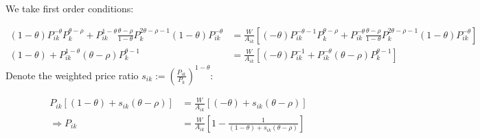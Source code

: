\documentclass[11pt]{article} %
\begin{document}
We take first order conditions:

\begin{align*}
(1-\theta)P_{ik}^{-\theta}P_k^{\theta - \rho} + P_{ik}^{1-\theta} \frac{\theta - \rho}{1-\theta}P_k^{2\theta - \rho - 1}(1-\theta)P_{ik}^{-\theta} &= \frac{W}{A_{ik}}\left[ (-\theta)P_{ik}^{-\theta-1}P_k^{\theta-\rho} + P_{ik}^{-\theta} \frac{\theta - \rho}{1-\theta} P_k^{2\theta - \rho - 1}(1-\theta)P_{ik}^{-\theta}\right]\\
(1-\theta) + P_{ik}^{1-\theta} (\theta - \rho)P_k^{\theta  - 1} &= \frac{W}{A_{ik}}\left[ (-\theta)P_{ik}^{-1} + P_{ik}^{-\theta} (\theta - \rho) P_k^{\theta - 1}\right]
\end{align*}
Denote the weighted price ratio $s_{ik}:= \left(\frac{P_{ik}}{P_{k}}\right)^{1-\theta}$:

\begin{align*}
P_{ik}[(1-\theta) +  s_{ik} (\theta - \rho)]&= \frac{W}{A_{ik}}\left[ (-\theta) + s_{ik} (\theta - \rho) \right]\\
\Rightarrow P_{ik} &= \frac{W}{A_{ik}}\left[ 1 - \frac{1}{(1-\theta) +  s_{ik} (\theta - \rho)} \right]
\end{align*}

\end{document}
